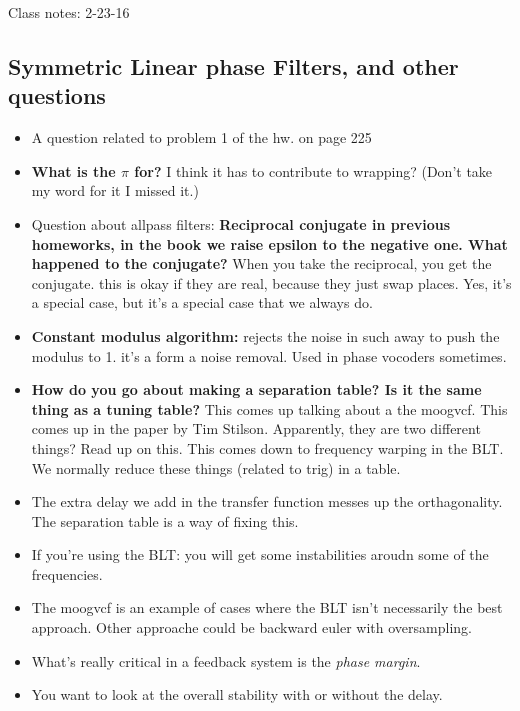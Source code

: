 Class notes: 2-23-16

\subsection*{Symmetric Linear phase Filters, and other questions}

\begin{itemize}
    \item{A question related to problem 1 of the hw. on page 225}
    \item{
        \textbf{What is the $\pi$ for?} I think it has to contribute to 
        wrapping? (Don't take my word for it I missed it.)
    }
    \item{
        Question about allpass filters: \textbf{Reciprocal conjugate in 
        previous homeworks, in the book we raise
        epsilon to the negative one.  What happened to the conjugate?} When you 
        take the reciprocal, you get the conjugate.  this is okay if they are real, 
        because they just swap places. Yes, it's a special case, but it's a special 
        case that we always do.
    }
    \item{
        \textbf{Constant modulus algorithm:} rejects the noise in such away to push the modulus to 1. 
        it's a form a noise removal. Used in phase vocoders sometimes. 
    }
    \item{ 
        \textbf{How do you go about making a separation table? 
        Is it the same thing as a tuning table?} 
        This comes up talking about a the moogvcf. This comes up in the paper by Tim Stilson.
        Apparently, they are two different things? Read up on this. 
        This comes down to frequency warping in the BLT. We normally reduce these things 
        (related to trig) in a table.
    }
    \item{ The extra delay we add in the transfer function messes up the orthagonality. The
     separation table is a way of fixing this. }
    \item{ If you're using the BLT: you will get some instabilities aroudn some of the frequencies.  }
    \item{ The moogvcf is an example of cases where the BLT isn't necessarily the best approach. 
        Other approache could be backward euler with oversampling. 
    }
    \item{
        What's really critical in a feedback system is the \textit{phase margin}.
    }
    \item{
        You want to look at the overall stability with or without the delay. 
    }
\end{itemize}

